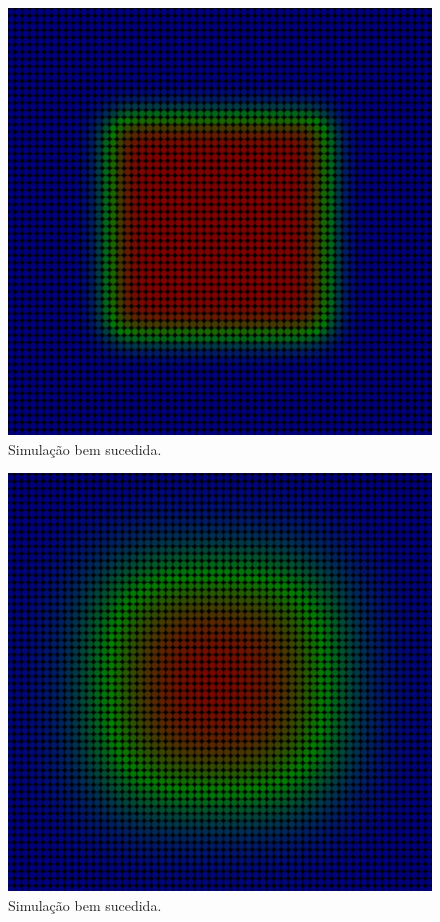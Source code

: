 \documentclass[xcolor=dvipsnames,10pt,aspectratio=169]{beamer}
\begin{document}
\begin{frame}
\begin{minipage}[h!]{0.30\textwidth}
\begin{figure}[h!]
			\includegraphics[trim = {1cm 1cm 1cm 1cm}, clip , angle=0, scale=0.3]{sucesso_2}
			\caption{Simulação bem sucedida.}
		\end{figure}
	\end{minipage}
\begin{minipage}[h!]{0.30\textwidth}
	\begin{figure}[h!]
		\centering
		\includegraphics[trim = {1cm 1cm 1cm 1cm}, clip , angle=0, scale=0.3]{sucesso_3}
		\caption{Simulação bem sucedida.}
	\end{figure}
\end{minipage}
	\end{frame}
\end{document}
